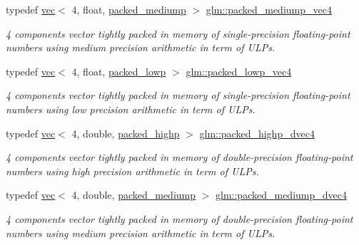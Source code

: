 \begin{DoxyCompactItemize}
typedef \hyperlink{structglm_1_1vec}{vec}$<$ 4, float, \hyperlink{namespaceglm_a36ed105b07c7746804d7fdc7cc90ff25a9604654c3b137cd7898689fd34b25bc0}{packed\+\_\+mediump} $>$ \hyperlink{group__gtc__type__aligned_ga18f1166b7888d6e0d7d659f5a022e6ea}{glm\+::packed\+\_\+mediump\+\_\+vec4}
\begin{DoxyCompactList}\small\item\em 4 components vector tightly packed in memory of single-\/precision floating-\/point numbers using medium precision arithmetic in term of U\+L\+Ps. \end{DoxyCompactList}\item 
typedef \hyperlink{structglm_1_1vec}{vec}$<$ 4, float, \hyperlink{namespaceglm_a36ed105b07c7746804d7fdc7cc90ff25ac36a4bd74559be2c0b65bc48e5953b8b}{packed\+\_\+lowp} $>$ \hyperlink{group__gtc__type__aligned_ga35756405558e0f3cd7d194f07d557276}{glm\+::packed\+\_\+lowp\+\_\+vec4}
\begin{DoxyCompactList}\small\item\em 4 components vector tightly packed in memory of single-\/precision floating-\/point numbers using low precision arithmetic in term of U\+L\+Ps. \end{DoxyCompactList}\item 
typedef \hyperlink{structglm_1_1vec}{vec}$<$ 4, double, \hyperlink{namespaceglm_a36ed105b07c7746804d7fdc7cc90ff25a8e8791ee77fe079b1291f710d88031bf}{packed\+\_\+highp} $>$ \hyperlink{group__gtc__type__aligned_ga7eb6a2440202876a3a223a1931dd496a}{glm\+::packed\+\_\+highp\+\_\+dvec4}
\begin{DoxyCompactList}\small\item\em 4 components vector tightly packed in memory of double-\/precision floating-\/point numbers using high precision arithmetic in term of U\+L\+Ps. \end{DoxyCompactList}\item 
typedef \hyperlink{structglm_1_1vec}{vec}$<$ 4, double, \hyperlink{namespaceglm_a36ed105b07c7746804d7fdc7cc90ff25a9604654c3b137cd7898689fd34b25bc0}{packed\+\_\+mediump} $>$ \hyperlink{group__gtc__type__aligned_gaa88ce743e1248a4e822e591e6bdf071b}{glm\+::packed\+\_\+mediump\+\_\+dvec4}
\begin{DoxyCompactList}\small\item\em 4 components vector tightly packed in memory of double-\/precision floating-\/point numbers using medium precision arithmetic in term of U\+L\+Ps. \end{DoxyCompactList}\item 

\end{DoxyCompactItemize}
